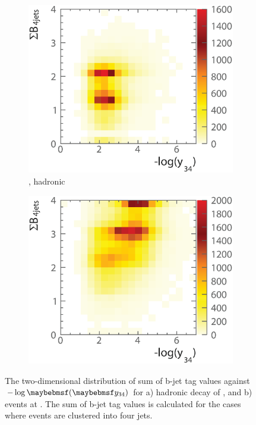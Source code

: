 \begin{figure}[!htbp]
  \begin{subfigure}[b]{0.45\textwidth}
    \includegraphics[width=\textwidth]{doubleHiggs/preSel/mutual6022bbWW2}
    \caption{\eeToHHbbWW, hadronic}
    \label{fig:doubleHiggs1.4MutualbbWW}
  \end{subfigure}
    \begin{subfigure}[b]{0.45\textwidth}
    \includegraphics[width=\textwidth]{doubleHiggs/preSel/mutual6022bbbb2}
    \caption{\eeToHHbbbb}
    \label{fig:doubleHiggs1.4Mutualbbbb}
  \end{subfigure}
\caption[Sum of b-jet tag values as a function of $-\log\parenths{\y{34}}$ at ]%
   {The two-dimensional distribution of sum of b-jet tag values against $-\log\parenths{\y{34}}$ for  a) hadronic \WW decay of \eeToHHbbWW, and b) \eeToHHbbbb events at . The sum of b-jet tag values is calculated for the cases where events are clustered into four jets.}
   \label{fig:doubleHiggsMutualPreselection}
\end{figure}


